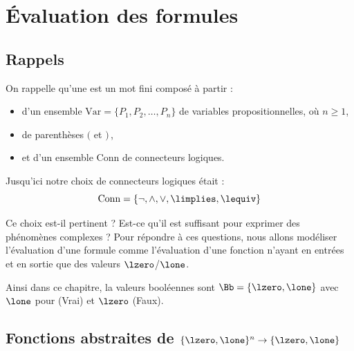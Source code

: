 \documentclass[11pt,class=report,crop=false]{standalone}
\begin{document}






\section{Évaluation des formules}

\subsection{Rappels}

On rappelle qu'une  est un mot fini composé à partir :
\begin{itemize}
	\item d'un ensemble $\text{Var} = \{P_1, P_2,\ldots, P_n\}$ de variables propositionnelles, où $n\ge1$,
	
	\item de parenthèses $($ et $)$\,,
		
	\item et d'un ensemble $\text{Conn}$ de connecteurs logiques.
\end{itemize}

Jusqu'ici notre choix de connecteurs logiques était :
\[
\text{Conn} = \{ \lnot, \land, \lor, \limplies, \lequiv \}
\]

Ce choix est-il pertinent ? Est-ce qu'il est suffisant pour exprimer des phénomènes complexes ? Pour répondre  à ces questions, nous allons modéliser l'évaluation d'une formule comme l'évaluation d'une fonction n'ayant en entrées et en sortie que des valeurs $\lzero$/$\lone$.

Ainsi dans ce chapitre, la valeurs booléennes sont $\Bb = \{ \lzero, \lone \}$ avec $\lone$ pour \ltrue{} (Vrai) et $\lzero${} (Faux).


\subsection{Fonctions abstraites de $\{\lzero,\lone\}^n \to \{\lzero,\lone\}$}
\end{document}

